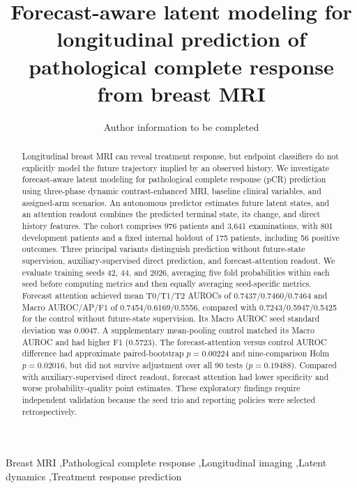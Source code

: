 \documentclass[5p,twocolumn,authoryear]{elsarticle}
\begin{document}
\begin{frontmatter}
\title{Forecast-aware latent modeling for longitudinal prediction of pathological complete response from breast MRI}
\author{Author information to be completed}
\address{Affiliations and corresponding author to be completed}
\begin{abstract}
Longitudinal breast MRI can reveal treatment response, but endpoint classifiers do not explicitly model the future trajectory implied by an observed history. We investigate forecast-aware latent modeling for pathological complete response (pCR) prediction using three-phase dynamic contrast-enhanced MRI, baseline clinical variables, and assigned-arm scenarios. An autonomous predictor estimates future latent states, and an attention readout combines the predicted terminal state, its change, and direct history features. The cohort comprises 976 patients and 3,641 examinations, with 801 development patients and a fixed internal holdout of 175 patients, including 56 positive outcomes. Three principal variants distinguish prediction without future-state supervision, auxiliary-supervised direct prediction, and forecast-attention readout. We evaluate training seeds 42, 44, and 2026, averaging five fold probabilities within each seed before computing metrics and then equally averaging seed-specific metrics. Forecast attention achieved mean T0/T1/T2 AUROCs of 0.7437/0.7460/0.7464 and Macro AUROC/AP/F1 of 0.7454/0.6169/0.5556, compared with 0.7243/0.5947/0.5425 for the control without future-state supervision. Its Macro AUROC seed standard deviation was 0.0047. A supplementary mean-pooling control matched its Macro AUROC and had higher F1 (0.5723). The forecast-attention versus control AUROC difference had approximate paired-bootstrap $p=0.00224$ and nine-comparison Holm $p=0.02016$, but did not survive adjustment over all 90 tests ($p=0.19488$). Compared with auxiliary-supervised direct readout, forecast attention had lower specificity and worse probability-quality point estimates. These exploratory findings require independent validation because the seed trio and reporting policies were selected retrospectively.
\end{abstract}
\begin{keyword}
Breast MRI \sep Pathological complete response \sep Longitudinal imaging \sep Latent dynamics \sep Treatment response prediction
\end{keyword}
\end{frontmatter}








\end{document}
